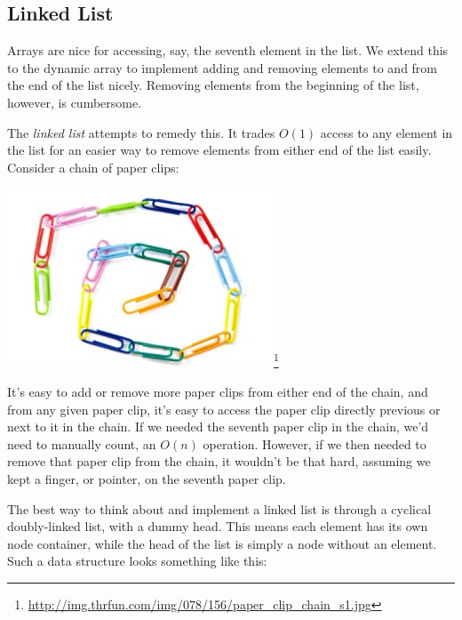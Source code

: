 \subsection{Linked List}

Arrays are nice for accessing, say, the seventh element in the list. We extend this to the dynamic array to implement adding and removing elements to and from the end of the list nicely. Removing elements from the beginning of the list, however, is cumbersome.

The \textit{linked list} attempts to remedy this. It trades $O(1)$ access to any element in the list for an easier way to remove elements from either end of the list easily. Consider a chain of paper clips:

\begin{center}

\includegraphics{images/paper_clip_chain.jpg}\footnote{\url{http://img.thrfun.com/img/078/156/paper_clip_chain_s1.jpg}}

\end{center}

It's easy to add or remove more paper clips from either end of the chain, and from any given paper clip, it's easy to access the paper clip directly previous or next to it in the chain. If we needed the seventh paper clip in the chain, we'd need to manually count, an $O(n)$ operation. However, if we then needed to remove that paper clip from the chain, it wouldn't be that hard, assuming we kept a finger, or pointer, on the seventh paper clip.

The best way to think about and implement a linked list is through a cyclical doubly-linked list, with a dummy head. This means each element has its own node container, while the head of the list is simply a node without an element. Such a data structure looks something like this:

